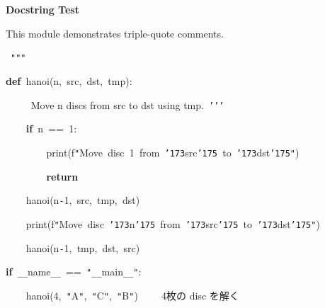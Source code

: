 \documentclass[a4paper,10pt]{article}
\def\mc{\relax}
\begin{document}
\tt\mc 

\noindent
\mbox{}\rm\mc {\tt "}{\tt "}{\tt "}\ 
\tt\mc 

\noindent
\mbox{}\rm\mc \parbox[t]{0.85\textwidth}{\ \centerline{\bf Docstring Test} }
\tt\mc 

\noindent
\mbox{}\rm\mc This module demonstrates triple-quote comments.
\tt\mc 

\noindent
\mbox{}\rm\mc \ {\tt "}{\tt "}{\tt "}
\tt\mc 

\noindent
\mbox{}\hfill

\noindent
\mbox{}\textbf{def}{\tt\mc \ }hanoi(n,{\tt\mc \ }src,{\tt\mc \ }dst,{\tt\mc \ }tmp):

\noindent
\mbox{}{\tt\mc \ }{\tt\mc \ }{\tt\mc \ }{\tt\mc \ }\rm\mc {\tt '}{\tt '}{\tt '}\ Move n discs from src to dst using tmp.\rm\mc \ {\tt '}{\tt '}{\tt '}
\tt\mc 

\noindent
\mbox{}{\tt\mc \ }{\tt\mc \ }{\tt\mc \ }{\tt\mc \ }\textbf{if}{\tt\mc \ }n{\tt\mc \ }=={\tt\mc \ }1:

\noindent
\mbox{}{\tt\mc \ }{\tt\mc \ }{\tt\mc \ }{\tt\mc \ }{\tt\mc \ }{\tt\mc \ }{\tt\mc \ }{\tt\mc \ }print(f{\tt "}Move{\tt\mc \ }disc{\tt\mc \ }1{\tt\mc \ }from{\tt\mc \ }{\tt\char'173}src{\tt\char'175}{\tt\mc \ }to{\tt\mc \ }{\tt\char'173}dst{\tt\char'175}{\tt "})

\noindent
\mbox{}{\tt\mc \ }{\tt\mc \ }{\tt\mc \ }{\tt\mc \ }{\tt\mc \ }{\tt\mc \ }{\tt\mc \ }{\tt\mc \ }\textbf{return}

\noindent
\mbox{}{\tt\mc \ }{\tt\mc \ }{\tt\mc \ }{\tt\mc \ }hanoi(n{\tt -}1,{\tt\mc \ }src,{\tt\mc \ }tmp,{\tt\mc \ }dst)

\noindent
\mbox{}{\tt\mc \ }{\tt\mc \ }{\tt\mc \ }{\tt\mc \ }print(f{\tt "}Move{\tt\mc \ }disc{\tt\mc \ }{\tt\char'173}n{\tt\char'175}{\tt\mc \ }from{\tt\mc \ }{\tt\char'173}src{\tt\char'175}{\tt\mc \ }to{\tt\mc \ }{\tt\char'173}dst{\tt\char'175}{\tt "})

\noindent
\mbox{}{\tt\mc \ }{\tt\mc \ }{\tt\mc \ }{\tt\mc \ }hanoi(n{\tt -}1,{\tt\mc \ }tmp,{\tt\mc \ }dst,{\tt\mc \ }src)

\noindent
\mbox{}\hfill

\noindent
\mbox{}\textbf{if}{\tt\mc \ }{\tt\_}{\tt\_}name{\tt\_}{\tt\_}{\tt\mc \ }=={\tt\mc \ }{\tt "}{\tt\_}{\tt\_}main{\tt\_}{\tt\_}{\tt "}:

\noindent
\mbox{}{\tt\mc \ }{\tt\mc \ }{\tt\mc \ }{\tt\mc \ }hanoi(4,{\tt\mc \ }{\tt "}A{\tt "},{\tt\mc \ }{\tt "}C{\tt "},{\tt\mc \ }{\tt "}B{\tt "}){\tt\mc \ }{\tt\mc \ }{\tt\mc \ }\rm\mc {\tt\#} \ 4枚の disc を解く \hfill

\tt\mc 

\rm\mc
\end{document}
